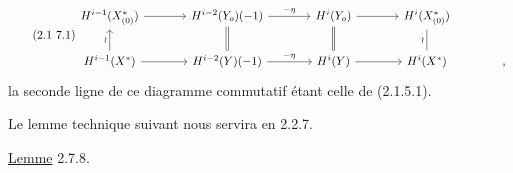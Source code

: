 
\begin{equation}\tag{2.1 7.1}
\begin{tikzcd}[column sep=large]
H^{i-1}(X^*_{(0)}) \arrow[r] & H^{i-2}(Y_o)(-1) \arrow[r, "-\eta"] & H^i(Y_o) \arrow[r] & H^i(X^*_{(0)}) & {} \\
H^{i-1}(X^*) \arrow[r] \arrow[u, "\wr"] & H^{i-2}(Y)(-1) \arrow[r, "-\eta"] \arrow[u, equal] & H^i(Y) \arrow[r] \arrow[u, equal] & H^i(X^*) \arrow[u, dash, "\wr"] & \mbox{,}
\end{tikzcd}
\end{equation}
la seconde ligne de ce diagramme commutatif étant celle de (2.1.5.1).

Le lemme technique suivant nous servira en 2.2.7.

\underline{Lemme} 2.7.8.

